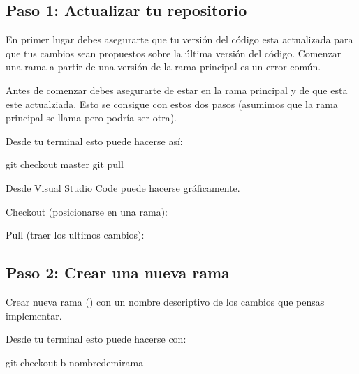 \documentclass[a4paper,12pt,spanish]{sphinxmanual}
\begin{document}
\subsection{Paso 1: Actualizar tu repositorio}
\label{\detokenize{mi-primer-pr:paso-1-actualizar-tu-repositorio}}
\sphinxAtStartPar
En primer lugar debes asegurarte que tu versión del código esta actualizada para
que tus cambios sean propuestos sobre la última versión del código.
Comenzar una rama a partir de una versión  de la rama principal es un error
común.

\sphinxAtStartPar
Antes de comenzar debes asegurarte de estar en la rama principal y de que esta este
actualziada. Esto se consigue con estos dos pasos (asumimos que la rama principal se
llama  pero podría ser otra).

\sphinxAtStartPar
Desde tu terminal esto puede hacerse así:

\begin{sphinxVerbatim}[commandchars=\\\{\}]
git checkout master
git pull
\end{sphinxVerbatim}

\sphinxAtStartPar
Desde Visual Studio Code puede hacerse gráficamente.

\sphinxAtStartPar
Checkout (posicionarse en una rama):

\noindent{}

\sphinxAtStartPar
Pull (traer los ultimos cambios):

\noindent{}


\subsection{Paso 2: Crear una nueva rama}
\label{\detokenize{mi-primer-pr:paso-2-crear-una-nueva-rama}}
\sphinxAtStartPar
Crear nueva rama () con un nombre descriptivo
de los cambios que pensas implementar.

\noindent{}

\sphinxAtStartPar
Desde tu terminal esto puede hacerse con:

\begin{sphinxVerbatim}[commandchars=\\\{\}]
git checkout \PYGZhy{}b nombre\PYGZus{}de\PYGZus{}mi\PYGZus{}rama
\end{sphinxVerbatim}
\end{document}

